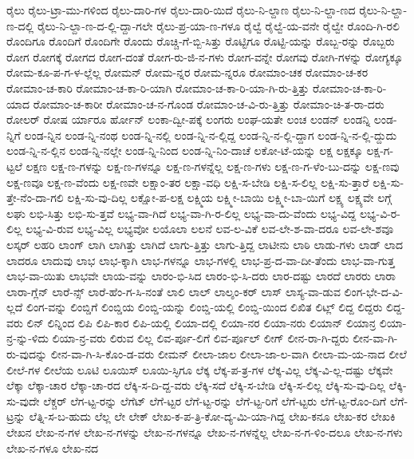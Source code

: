{ರೈಲು
ರೈಲು-ಟ್ರಾ-ಮು-ಗಳಿಂದ
ರೈಲು-ದಾರಿ-ಗಳ
ರೈಲು-ದಾರಿ-ಯಿದೆ
ರೈಲು-ನಿ-ಲ್ದಾಣ
ರೈಲು-ನಿ-ಲ್ದಾ-ಣದ
ರೈಲು-ನಿ-ಲ್ದಾ-ಣ-ದಲ್ಲಿ
ರೈಲು-ನಿ-ಲ್ದಾ-ಣ-ದ-ಲ್ಲಿ-ದ್ದಾ-ಗಲೇ
ರೈಲು-ಪ್ರ-ಯಾ-ಣ-ಗಳೂ
ರೈಲ್ವೆ
ರೈಲ್ವೆ-ಯ-ವನೇ
ರೈಲ್ವೇ
ರೊಂದಿ-ಗಿ-ರಲಿ
ರೊಂದಿಗೂ
ರೊಂದಿಗೆ
ರೊಂದಿಗೇ
ರೊಂದು
ರೊಚ್ಚಿ-ಗೆ-ಬ್ಬಿ-ಸಿತ್ತು
ರೊಟ್ಟಿಗೂ
ರೊಟ್ಟಿ-ಯನ್ನು
ರೊಬ್ಬ-ರನ್ನು
ರೊಬ್ಬರು
ರೋಗ
ರೋಗಕ್ಕೆ
ರೋಗದ
ರೋಗ-ದಂತೆ
ರೋಗ-ರು-ಜಿ-ನ-ಗಳು
ರೋಗ-ವನ್ನೇ
ರೋಗವು
ರೋಗಿ-ಗಳನ್ನು
ರೋಗ್ಯಕ್ಕೂ
ರೋಮ-ಕೂ-ಪ-ಗ-ಳ-ಲ್ಲೆಲ್ಲ
ರೋಮನ್
ರೋಮ-ನ್ನರ
ರೋಮ-ನ್ನರೂ
ರೋಮಾಂ-ಚಕ
ರೋಮಾಂ-ಚ-ಕರ
ರೋಮಾಂ-ಚ-ಕಾರಿ
ರೋಮಾಂ-ಚ-ಕಾ-ರಿ-ಯಾಗಿ
ರೋಮಾಂ-ಚ-ಕಾ-ರಿ-ಯಾ-ಗಿ-ರು-ತ್ತಿತ್ತು
ರೋಮಾಂ-ಚ-ಕಾ-ರಿ-ಯಾದ
ರೋಮಾಂ-ಚ-ಕಾರೀ
ರೋಮಾಂ-ಚ-ನ-ಗೊಂಡ
ರೋಮಾಂ-ಚ-ವಿ-ರು-ತ್ತಿತ್ತು
ರೋಮಾಂ-ಚಿ-ತ-ರಾ-ದರು
ರೋಲರ್
ರೋಷ
ರ್ಯಾರೂ
ರ್ಹೋನ್
ಲಂಕಾ-ದ್ವೀ-ಪಕ್ಕೆ
ಲಂಗರು
ಲಂಘ-ಯತೇ
ಲಂಚ
ಲಂಡನ್
ಲಂಡನ್ನಿ
ಲಂಡ-ನ್ನಿಗೆ
ಲಂಡ-ನ್ನಿನ
ಲಂಡ-ನ್ನಿ-ನಂಥ
ಲಂಡ-ನ್ನಿ-ನಲ್ಲಿ
ಲಂಡ-ನ್ನಿ-ನ-ಲ್ಲಿದ್ದ
ಲಂಡ-ನ್ನಿ-ನ-ಲ್ಲಿ-ದ್ದಾಗ
ಲಂಡ-ನ್ನಿ-ನ-ಲ್ಲಿ-ದ್ದುದು
ಲಂಡ-ನ್ನಿ-ನ-ಲ್ಲಿನ
ಲಂಡ-ನ್ನಿ-ನಲ್ಲೇ
ಲಂಡ-ನ್ನಿ-ನಿಂದ
ಲಂಡ-ನ್ನಿ-ನಿಂ-ದಾಚೆ
ಲಕೋ-ಟೆ-ಯನ್ನು
ಲಕ್ಷ
ಲಕ್ಷಕ್ಕೂ
ಲಕ್ಷ-ಗ-ಟ್ಟಲೆ
ಲಕ್ಷಣ
ಲಕ್ಷ-ಣ-ಗಳನ್ನು
ಲಕ್ಷ-ಣ-ಗಳನ್ನೂ
ಲಕ್ಷ-ಣ-ಗಳನ್ನೆಲ್ಲ
ಲಕ್ಷ-ಣ-ಗಳು
ಲಕ್ಷ-ಣ-ಗ-ಳೆಂ-ಬು-ದನ್ನು
ಲಕ್ಷ-ಣವು
ಲಕ್ಷ-ಣವೂ
ಲಕ್ಷ-ಣ-ವೆಂದು
ಲಕ್ಷ-ಣವೇ
ಲಕ್ಷಾಂ-ತರ
ಲಕ್ಷಾ-ವಧಿ
ಲಕ್ಷಿ-ಸ-ಬೇಡಿ
ಲಕ್ಷಿ-ಸ-ಲಿಲ್ಲ
ಲಕ್ಷಿ-ಸು-ತ್ತಾರೆ
ಲಕ್ಷಿ-ಸು-ತ್ತೇ-ನೆಂ-ದಾ-ಗಲಿ
ಲಕ್ಷಿ-ಸು-ವು-ದಿಲ್ಲ
ಲಕ್ಷೋ-ಪ-ಲಕ್ಷ
ಲಕ್ಷ್ಮಿಯ
ಲಕ್ಷ್ಮೀ-ಬಾಯಿ
ಲಕ್ಷ್ಮೀ-ಬಾ-ಯಿಗೆ
ಲಕ್ಷ್ಯ
ಲಕ್ಷ್ಯವೇ
ಲಗ್ಗೆ
ಲಘು
ಲಭಿ-ಸಿತ್ತು
ಲಭಿ-ಸು-ತ್ತವೆ
ಲಭ್ಯ-ವಾ-ಗಿದೆ
ಲಭ್ಯ-ವಾ-ಗಿ-ರ-ಲಿಲ್ಲ
ಲಭ್ಯ-ವಾ-ದು-ವೆಂದು
ಲಭ್ಯ-ವಿದ್ದ
ಲಭ್ಯ-ವಿ-ರ-ಲಿಲ್ಲ
ಲಭ್ಯ-ವಿ-ರುವ
ಲಭ್ಯ-ವಿಲ್ಲ
ಲಭ್ಯವೋ
ಲಯೊಲಾ
ಲಲನೆ
ಲವ-ಲ-ವಿಕೆ
ಲವ-ಲೇ-ಶ-ವಾ-ದರೂ
ಲವ-ಲೇ-ಶವೂ
ಲಸ್ಕರ್
ಲಹರಿ
ಲಾಂಗ್
ಲಾಗಿ
ಲಾಗಿತ್ತು
ಲಾಗಿದೆ
ಲಾಗು-ತ್ತಿತ್ತು
ಲಾಗು-ತ್ತಿದ್ದ
ಲಾಟೀನು
ಲಾಠಿ
ಲಾಡು-ಗಳು
ಲಾಡ್
ಲಾದ
ಲಾದರೂ
ಲಾದುವು
ಲಾಭ
ಲಾಭ-ಕ್ಕಾಗಿ
ಲಾಭ-ಗಳನ್ನೂ
ಲಾಭ-ಗಳಲ್ಲಿ
ಲಾಭ-ಪ್ರ-ದ-ವಾ-ದೀ-ತೆಂದು
ಲಾಭ-ವಾ-ಗುತ್ತ
ಲಾಭ-ವಾ-ಯಿತು
ಲಾಭವೇ
ಲಾಯ-ವನ್ನು
ಲಾರಂ-ಭಿ-ಸಿದ
ಲಾರಂ-ಭಿ-ಸಿ-ದರು
ಲಾರ-ದಷ್ಟು
ಲಾರದೆ
ಲಾರರು
ಲಾರಾ
ಲಾರಾ-ಗ್ಲೆನ್
ಲಾರೆ-ನ್ಸ್
ಲಾರೆ-ಹೆಂ-ಗ-ಸಿ-ನಂತೆ
ಲಾಲಿ
ಲಾಲ್
ಲಾಲ್ಶಂ-ಕರ್
ಲಾಸ್
ಲಾಸ್ಯ-ವಾ-ಡುವ
ಲಿಂಗ-ಭೇ-ದ-ವಿ-ಲ್ಲದೆ
ಲಿಂಗ-ವನ್ನು
ಲಿಂಬ್ಡಿಗೆ
ಲಿಂಬ್ಡಿಯ
ಲಿಂಬ್ಡಿ-ಯನ್ನು
ಲಿಂಬ್ಡಿ-ಯಲ್ಲಿ
ಲಿಂಬ್ಡಿ-ಯಿಂದ
ಲಿಖಿತ
ಲಿಟ್ಲ್
ಲಿದ್ದ
ಲಿದ್ದರು
ಲಿದ್ದ-ವರು
ಲಿನ್
ಲಿನ್ನಿಂದ
ಲಿಪಿ
ಲಿಪಿ-ಕಾರ
ಲಿಪಿ-ಯಲ್ಲಿ
ಲಿಯಾ-ದಲ್ಲಿ
ಲಿಯಾ-ನರ
ಲಿಯಾ-ನರು
ಲಿಯಾನ್
ಲಿಯಾನ್ರ
ಲಿಯಾ-ನ್ರ-ನ್ನು-ಳಿದು
ಲಿಯಾ-ನ್ರ-ವರು
ಲಿರುವ
ಲಿಲ್ಲ
ಲಿವ-ರ್ಪೂ-ಲಿಗೆ
ಲಿವ-ರ್ಪೂಲ್
ಲೀಗ್
ಲೀನ-ರಾ-ಗಿ-ದ್ದರು
ಲೀನ-ವಾ-ಗಿ-ರು-ವುದನ್ನು
ಲೀನ-ವಾ-ಗಿ-ಸಿ-ಕೊಂ-ಡ-ವರು
ಲೀಮನ್
ಲೀಲಾ-ಜಾಲ
ಲೀಲಾ-ಜಾ-ಲ-ವಾಗಿ
ಲೀಲಾ-ಮ-ಯ-ನಾದ
ಲೀಲೆ
ಲೀಲೆ-ಗಳ
ಲೀಲೆಯ
ಲೂಟಿ
ಲೂಯಿಸ್
ಲೂಯಿ-ಸ್ಳಿಗೂ
ಲೆಕ್ಕ
ಲೆಕ್ಕ-ಪ-ತ್ರ-ಗಳ
ಲೆಕ್ಕ-ವಿಲ್ಲ
ಲೆಕ್ಕ-ವಿ-ಲ್ಲ-ದಷ್ಟು
ಲೆಕ್ಕವೇ
ಲೆಕ್ಕಾ
ಲೆಕ್ಕಾ-ಚಾರ
ಲೆಕ್ಕಾ-ಚಾ-ರದ
ಲೆಕ್ಕಿ-ಸ-ದಿ-ದ್ದ-ವರು
ಲೆಕ್ಕಿ-ಸದೆ
ಲೆಕ್ಕಿ-ಸ-ಬೇಡಿ
ಲೆಕ್ಕಿ-ಸ-ಲಿಲ್ಲ
ಲೆಕ್ಕಿ-ಸು-ವು-ದಿಲ್ಲ
ಲೆಕ್ಕಿ-ಸು-ವುದೇ
ಲೆಕ್ಚರ್
ಲೆಗ-ಟ್ಟ-ರನ್ನು
ಲೆಗೆಟ್
ಲೆಗೆ-ಟ್ಟರ
ಲೆಗೆ-ಟ್ಟ-ರನ್ನು
ಲೆಗೆ-ಟ್ಟ-ರಿಗೆ
ಲೆಗೆ-ಟ್ಟರು
ಲೆಗೆ-ಟ್ಟ-ರೊಂ-ದಿಗೆ
ಲೆಗೆ-ಟ್ರನ್ನು
ಲೆತ್ನಿ-ಸ-ಬ-ಹುದು
ಲೆಲ್ಲ
ಲೇ
ಲೇಕ್
ಲೇಖ-ಕ-ಪ-ತ್ರಿ-ಕೋ-ದ್ಯ-ಮಿ-ಯಾ-ಗಿದ್ದ
ಲೇಖ-ಕನೂ
ಲೇಖ-ಕರ
ಲೇಖಕಿ
ಲೇಖನ
ಲೇಖ-ನ-ಗಳ
ಲೇಖ-ನ-ಗಳನ್ನು
ಲೇಖ-ನ-ಗಳನ್ನೂ
ಲೇಖ-ನ-ಗಳನ್ನೆಲ್ಲ
ಲೇಖ-ನ-ಗ-ಳಿಂ-ದಲೂ
ಲೇಖ-ನ-ಗಳು
ಲೇಖ-ನ-ಗಳೂ
ಲೇಖ-ನದ
}
